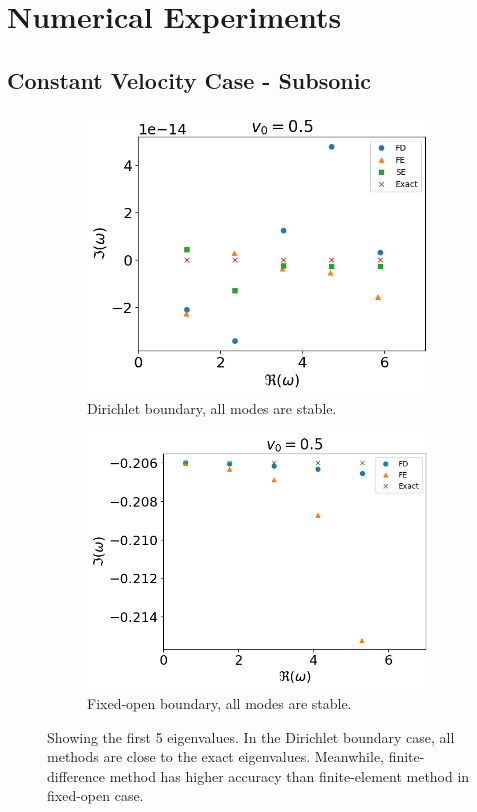 \chapter{Numerical Experiments}
\section{Constant Velocity Case - Subsonic}
\begin{figure}[H]
  \centering
  \begin{subfigure}{0.45\textwidth}
    \includegraphics[width=0.9\linewidth]{../../thesis/img/numerical-experiments/fixed-fixed/constant-v-v0=0.5}
    \caption{Dirichlet boundary, all modes are stable.}
  \end{subfigure}%
  \begin{subfigure}{0.45\textwidth}
    \includegraphics[width=\linewidth]{../../thesis/img/numerical-experiments/fixed-open/constant-v-v0=0.5}
    \caption{Fixed-open boundary, all modes are stable.}
  \end{subfigure}
  \caption{Showing the first 5 eigenvalues. In the Dirichlet boundary case, all methods are close to the exact eigenvalues. Meanwhile, finite-difference method has higher accuracy than finite-element method in fixed-open case.}
  \label{fig:constant-v-subsonic}
\end{figure}

